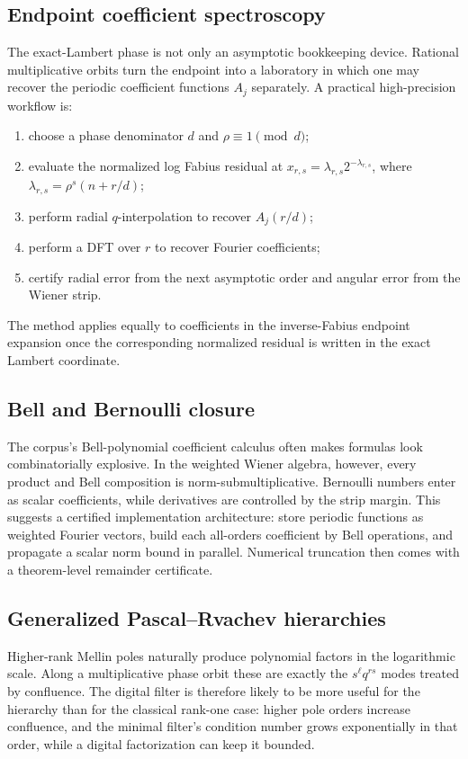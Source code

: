 \documentclass[11pt]{article}
\numberwithin{equation}{section}
\theoremstyle{definition}
\theoremstyle{remark}
\begin{document}
\subsection{Endpoint coefficient spectroscopy}

The exact-Lambert phase is not only an asymptotic bookkeeping device.  Rational
multiplicative orbits turn the endpoint into a laboratory in which one may recover the
periodic coefficient functions $A_j$ separately.  A practical high-precision workflow is:
\begin{enumerate}
\item choose a phase denominator $d$ and $\rho\equiv1\pmod d$;
\item evaluate the normalized log Fabius residual at
$x_{r,s}=\lambda_{r,s}2^{-\lambda_{r,s}}$, where
$\lambda_{r,s}=\rho^s(n+r/d)$;
\item perform radial $q$-interpolation to recover $A_j(r/d)$;
\item perform a DFT over $r$ to recover Fourier coefficients;
\item certify radial error from the next asymptotic order and angular error from the
      Wiener strip.
\end{enumerate}
The method applies equally to coefficients in the inverse-Fabius endpoint expansion once
the corresponding normalized residual is written in the exact Lambert coordinate.

\subsection{Bell and Bernoulli closure}

The corpus's Bell-polynomial coefficient calculus often makes formulas look combinatorially
explosive.  In the weighted Wiener algebra, however, every product and Bell composition is
norm-submultiplicative.  Bernoulli numbers enter as scalar coefficients, while derivatives
are controlled by the strip margin.  This suggests a certified implementation architecture:
store periodic functions as weighted Fourier vectors, build each all-orders coefficient by
Bell operations, and propagate a scalar norm bound in parallel.  Numerical truncation then
comes with a theorem-level remainder certificate.

\subsection{Generalized Pascal--Rvachev hierarchies}

Higher-rank Mellin poles naturally produce polynomial factors in the logarithmic scale.
Along a multiplicative phase orbit these are exactly the $s^\ell q^{rs}$ modes treated by
confluence.  The digital filter is therefore likely to be more useful for the hierarchy
than for the classical rank-one case: higher pole orders increase confluence, and the
minimal filter's condition number grows exponentially in that order, while a digital
factorization can keep it bounded.
\end{document}
